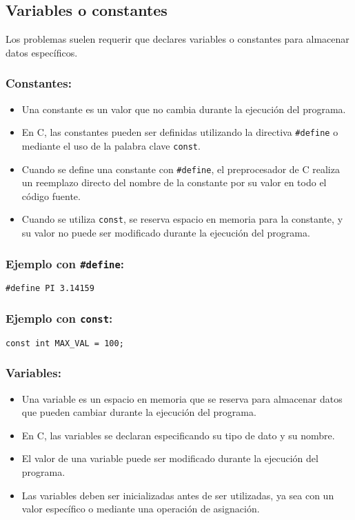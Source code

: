 \documentclass{article}
\begin{document}
\subsection{Variables o constantes}
Los problemas suelen requerir que declares variables o constantes para almacenar datos específicos.
\subsubsection{Constantes:}
\begin{itemize}
    \item Una constante es un valor que no cambia durante la ejecución del programa.
    \item En C, las constantes pueden ser definidas utilizando la directiva \texttt{\#define} o mediante el uso de la palabra clave \texttt{const}.
    \item Cuando se define una constante con \texttt{\#define}, el preprocesador de C realiza un reemplazo directo del nombre de la constante por su valor en todo el código fuente.
    \item Cuando se utiliza \texttt{const}, se reserva espacio en memoria para la constante, y su valor no puede ser modificado durante la ejecución del programa.
\end{itemize}

\subsubsection*{Ejemplo con \texttt{\#define}:}

\begin{verbatim}
#define PI 3.14159
\end{verbatim}

\subsubsection*{Ejemplo con \texttt{const}:}

\begin{verbatim}
const int MAX_VAL = 100;
\end{verbatim}

\subsubsection{Variables:}
\begin{itemize}
    \item Una variable es un espacio en memoria que se reserva para almacenar datos que pueden cambiar durante la ejecución del programa.
    \item En C, las variables se declaran especificando su tipo de dato y su nombre.
    \item El valor de una variable puede ser modificado durante la ejecución del programa.
    \item Las variables deben ser inicializadas antes de ser utilizadas, ya sea con un valor específico o mediante una operación de asignación.
\end{itemize}
\end{document}
